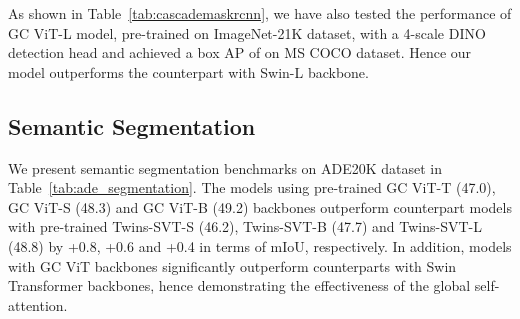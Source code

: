 \documentclass{article}
\theoremstyle{plain}
\theoremstyle{definition}
\theoremstyle{remark}
\begin{document}
As shown in Table~\ref{tab:cascademaskrcnn}, we have also tested the performance of GC ViT-L model, pre-trained on ImageNet-21K dataset, with a 4-scale DINO~\citep{zhang2022dino} detection head and achieved a box AP of  on MS COCO dataset. Hence our model outperforms the counterpart with Swin-L backbone.


\subsection{Semantic Segmentation}
\label{sec:exp_ade_seg_results}
We present semantic segmentation benchmarks on ADE20K dataset in Table~\ref{tab:ade_segmentation}. The models using pre-trained GC ViT-T (47.0), GC ViT-S (48.3) and GC ViT-B (49.2) backbones outperform counterpart models with pre-trained Twins-SVT-S \citep{chu2021twins} (46.2), Twins-SVT-B \citep{chu2021twins} (47.7) and Twins-SVT-L \citep{chu2021twins} (48.8) by +0.8, +0.6 and +0.4 in terms of mIoU, respectively. In addition, models with GC ViT backbones significantly outperform counterparts with Swin Transformer backbones, hence demonstrating the effectiveness of the global self-attention.


\begin{table}
\centering
{}
\caption{Object detection benchmarks using DINO~\citep{zhang2022dino} network on \textbf{MS COCO} dataset~\citep{lin2014microsoft}.  denotes models that are pre-trained on ImageNet-21K dataset.}
\label{tab:dino}
\end{table}
\end{document}
